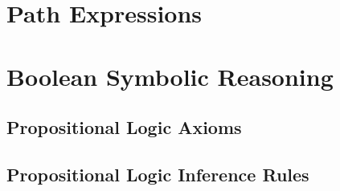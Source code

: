 \section{Path Expressions}


\section{Boolean Symbolic Reasoning}

\subsection{Propositional Logic Axioms}

\subsection{Propositional Logic Inference Rules}
